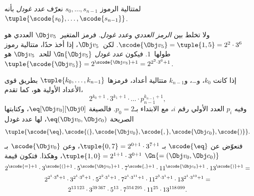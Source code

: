 \documentclass[../../../include/open-logic-section]{subfiles}
\begin{document}
\begin{defn}
لمتتالية الرموز $s_0,\dots,s_{n-1}$ نعرّف
\emph{عدد غودل} بأنه
$\tuple{\scode{s_0},\dots,\scode{s_{n-1}}}$.
\end{defn}

\begin{explain}
ولا تخلط بين \emph{الرمز العددي} و\emph{عدد غودل}.
فرمز المتغير~$\Obj v_5$ العددي هو
$\scode{\Obj v_5}=\tuple{1,5}=2^2\cdot3^6$.
لكن~$\Obj v_5$، إذا أخذ حدًا، متتالية
رموز طولها~$1$. فيكون \emph{عدد غودل}
$\Gn{\Obj v_5}$ لل\emph{حد}~$\Obj v_5$
هو $\tuple{\scode{\Obj v_5}}=2^{\scode{\Obj v_5}+1}
=2^{2^2\cdot3^6+1}$.
\end{explain}

\begin{ex}
إذا كانت $k_0$، و\dots، و$k_{n-1}$ متتالية أعداد،
فرمزها $\tuple{k_0,\dots,k_{n-1}}$ بطريق قوى الأعداد
الأولية هو، كما تقدم،
\[
2^{k_0+1}\cdot3^{k_1+1}\cdot \dots \cdot p_{n-1}^{k_{n-1}+1},
\]
وفيه $p_i$ العدد الأولي رقم $i$، مع الابتداء بـ$p_0=2$.
فالصيغة $\eq[\Obj v_0][\Obj 0]$، وكتابتها الصريحة
${\eq}(\Obj v_0,\Obj c_0)$، لها عدد غودل
\[
\tuple{\scode{\eq},\scode{(},\scode{\Obj v_0},\scode{,}, \scode{\Obj
    c_0},\scode{)}}.
\]
فنعوّض عن $\scode{\eq}$ بـ $\tuple{0,7}=2^{0+1}\cdot3^{7+1}$، وعن
$\scode{\Obj v_0}$ بـ $\tuple{1,0}=2^{1+1}\cdot3^{0+1}$، وهكذا.
فتكون قيمة $\Gn{=(\Obj v_0,\Obj c_0)}$
\begin{multline*}
2^{\scode{=} + 1}\cdot 3^{\scode{(}+1}\cdot 5^{\scode{\Obj v_0}+1}
\cdot 7^{\scode{,} + 1} \cdot 11^{\scode{\Obj c_0}+1} \cdot
13^{\scode{)}+1} = \\
2^{2^1\cdot 3^8 + 1}\cdot 3^{2^1\cdot 3^9+1}\cdot 5^{2^2\cdot 3^1+1}
\cdot 7^{2^1\cdot 3^{11} + 1} \cdot 11^{2^3\cdot3^1+1} \cdot
13^{2^1\cdot3^{10}+1} = \\
2^{13\,123}\cdot 3^{39\,367}\cdot 5^{13}\cdot 7^{354\,295}\cdot11^{25}\cdot13^{118\,099}.
\end{multline*}
\end{ex}
\end{document}
